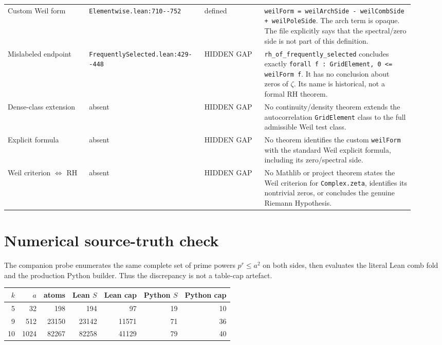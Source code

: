 \documentclass[10pt]{article}
\newcommand{\gap}{\textcolor{red!75!black}{HIDDEN GAP}}
\newcommand{\code}[1]{\nolinkurl{#1}}
\begin{document}
\begin{longtable}{@{}p{0.19\linewidth}p{0.24\linewidth}p{0.14\linewidth}p{0.35\linewidth}@{}}
Custom Weil form & \code{Elementwise.lean:710--752} & defined &
\code{weilForm = weilArchSide - weilCombSide + weilPoleSide}.
The arch term is opaque.  The file explicitly says that the
spectral/zero side is not part of this definition. \\

Mislabeled endpoint & \code{FrequentlySelected.lean:429--448} & \gap &
\code{rh_of_frequently_selected} concludes exactly
\code{forall f : GridElement, 0 <= weilForm f}.
It has no conclusion about zeros of $\zeta$.  Its name is historical,
not a formal RH theorem. \\

Dense-class extension & absent & \gap &
No continuity/density theorem extends the autocorrelation
\code{GridElement} class to the full admissible Weil test class. \\

Explicit formula & absent & \gap &
No theorem identifies the custom \code{weilForm} with the standard
Weil explicit formula, including its zero/spectral side. \\

Weil criterion $\Leftrightarrow$ RH & absent & \gap &
No Mathlib or project theorem states the Weil criterion for
\code{Complex.zeta}, identifies its nontrivial zeros, or concludes
the genuine Riemann Hypothesis. \\
\bottomrule
\end{longtable}
\normalsize

\section{Numerical source-truth check}

The companion probe enumerates the same complete set of prime powers
$p^r\le a^2$ on both sides, then evaluates the literal Lean comb fold
and the production Python builder.  Thus the discrepancy is not a
table-cap artefact.

\begin{center}
\begin{tabular}{@{}rrrrrrr@{}}
\toprule
$k$ & $a$ & atoms & Lean $S$ & Lean cap & Python $S$ & Python cap \\
\midrule
5  & 32   & 198   & 194   & 97    & 19 & 10 \\
9  & 512  & 23150 & 23142 & 11571 & 71 & 36 \\
10 & 1024 & 82267 & 82258 & 41129 & 79 & 40 \\
\bottomrule
\end{tabular}
\end{center}
\end{document}
